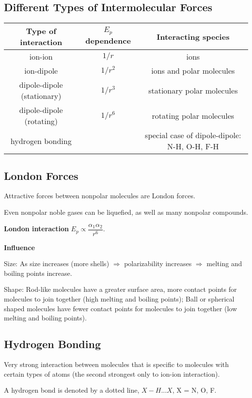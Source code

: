 \documentclass[a4paper,12pt]{article}
\begin{document}
\subsection{Different Types of Intermolecular Forces}
\begin{center}
  \begin{tabular}{ccc}
    \toprule
    Type of interaction & $E_{p}$ dependence & Interacting species \\
    \hline
    ion-ion    & $1/r$  & ions  \\
    ion-dipole  & $1/r^{2}$  & ions and polar molecules  \\
    dipole-dipole (stationary)  & $1/r^{3}$  & stationary polar molecules  \\
    dipole-dipole (rotating)  & $1/r^{6}$  &rotating polar molecules  \\
    hydrogen bonding &   &special case of dipole-dipole: N-H, O-H, F-H  \\
    \bottomrule
  \end{tabular}
\end{center}
\subsection{London Forces}
Attractive forces between nonpolar molecules are London forces.\par
Even nonpolar noble gases can be liquefied, as well as many nonpolar compounds.\par
\textbf{London interaction} $E_{p} \propto \dfrac{\alpha_{1}\alpha_{2}}{r^{6}}$.\par
\textbf{Influence}\par
Size: As size increases (more shells) $\Rightarrow$ polarizability increases $\Rightarrow$ melting and boiling points increase.\par
Shape: Rod-like molecules have a greater surface area, more contact points for molecules to join together (high melting and boiling points); Ball or spherical shaped molecules have fewer contact points for molecules to join together (low melting and boiling points).
\subsection{Hydrogen Bonding}
Very strong interaction between molecules that is specific to molecules with certain types of atoms (the second strongest only to ion-ion interaction).\par
A hydrogen bond is denoted by a dotted line, $X-H...X$, X = N, O, F.
\end{document}
